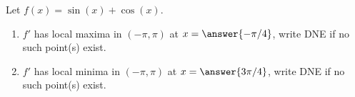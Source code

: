 \documentclass{ximera}
\author{Gregory Hartman \and Matthew Carr}
\begin{document}
\begin{exercise}






Let $f(x)=\sin(x)+\cos(x)$.
\begin{enumerate}
\item		$f'$ has local maxima in $(-\pi,\pi)$ at $x=\answer{-\pi/4}$, write DNE if no such point(s) exist.
\item		$f'$ has local minima in $(-\pi,\pi)$ at $x=\answer{3\pi/4}$, write DNE if no such point(s) exist.
\end{enumerate}

\end{exercise}
\end{document}
